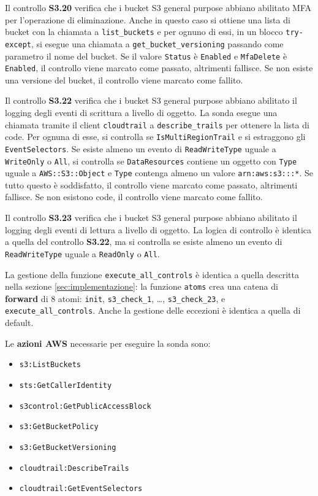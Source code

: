Il controllo \textbf{S3.20} verifica che i bucket S3 general purpose abbiano abilitato MFA per l'operazione di eliminazione. Anche in questo caso si ottiene una lista di bucket con la chiamata a \texttt{list\_buckets} e per ognuno di essi, in un blocco \texttt{try-except}, si esegue una chiamata a \texttt{get\_bucket\_versioning} passando come parametro il nome del bucket. Se il valore \texttt{Status} è \texttt{Enabled} e \texttt{MfaDelete} è \texttt{Enabled}, il controllo viene marcato come passato, altrimenti fallisce. Se non esiste una versione del bucket, il controllo viene marcato come fallito.

Il controllo \textbf{S3.22} verifica che i bucket S3 general purpose abbiano abilitato il logging degli eventi di scrittura a livello di oggetto. La sonda esegue una chiamata tramite il client \texttt{cloudtrail} a \texttt{describe\_trails} per ottenere la lista di code. Per ognuna di esse, si controlla se \texttt{IsMultiRegionTrail} e si estraggono gli \texttt{EventSelectors}. Se esiste almeno un evento di \texttt{ReadWriteType} uguale a \texttt{WriteOnly} o \texttt{All}, si controlla se \texttt{DataResources} contiene un oggetto con \texttt{Type} uguale a \texttt{AWS::S3::Object} e \texttt{Type} contenga almeno un  valore \texttt{arn:aws:s3:::*}. Se tutto questo è soddisfatto, il controllo viene marcato come passato, altrimenti fallisce. Se non esistono code, il controllo viene marcato come fallito.

Il controllo \textbf{S3.23} verifica che i bucket S3 general purpose abbiano abilitato il logging degli eventi di lettura a livello di oggetto. La logica di controllo è identica a quella del controllo \textbf{S3.22}, ma si controlla se esiste almeno un evento di \texttt{ReadWriteType} uguale a \texttt{ReadOnly} o \texttt{All}. 

La gestione della funzione \texttt{execute\_all\_controls} è identica a quella descritta nella sezione \ref{sec:implementazione}: la funzione \texttt{atoms} crea una catena di \textbf{forward} di 8 atomi: \texttt{init}, \texttt{s3\_check\_1}, \dots, \texttt{s3\_check\_23}, e \texttt{execute\_all\_controls}. Anche la gestione delle eccezioni è identica a quella di default.

\vspace{1em}

\noindent Le \textbf{azioni AWS} necessarie per eseguire la sonda sono:
\begin{itemize}
    \item \texttt{s3:ListBuckets}
    \item \texttt{sts:GetCallerIdentity}
    \item \texttt{s3control:GetPublicAccessBlock}
    \item \texttt{s3:GetBucketPolicy}
    \item \texttt{s3:GetBucketVersioning}
    \item \texttt{cloudtrail:DescribeTrails}
    \item \texttt{cloudtrail:GetEventSelectors}
\end{itemize}

